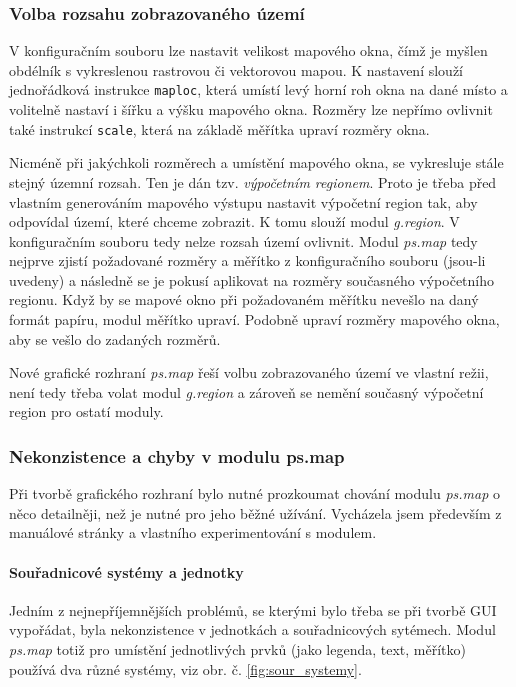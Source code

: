 \documentclass[a4paper,12pt,draft]{article}
\newcommand{\modul}[1]{\emph{#1}}
\newcommand{\instr}[1]{\lstinline[style=psmapInline]|#1|}
\begin{document}
\subsubsection{Volba rozsahu zobrazovaného území}
\label{sec:psmap:rozsah}
V konfiguračním souboru lze nastavit velikost mapového okna, čímž je myšlen obdélník s vykreslenou rastrovou či vektorovou mapou.  K nastavení slouží jednořádková instrukce \instr{maploc}, která umístí levý horní roh okna na dané místo a volitelně nastaví i šířku a výšku mapového okna. Rozměry lze nepřímo ovlivnit také instrukcí \instr{scale}, která na základě měřítka upraví rozměry okna. 

Nicméně při jakýchkoli rozměrech a umístění mapového okna, se vykresluje stále stejný územní rozsah. Ten je dán tzv. \emph{výpočetním regionem}. Proto je třeba před vlastním generováním mapového výstupu nastavit výpočetní region tak, aby odpovídal území, které chceme zobrazit. K tomu slouží modul \modul{g.region}. V konfiguračním souboru tedy nelze rozsah území ovlivnit.
Modul \modul{ps.map} tedy nejprve zjistí požadované rozměry a měřítko z konfiguračního souboru (jsou-li uvedeny) a následně se je pokusí aplikovat na rozměry současného výpočetního regionu. Když by se mapové okno při požadovaném měřítku nevešlo na daný formát papíru, modul měřítko upraví. Podobně upraví rozměry mapového okna, aby se vešlo do zadaných rozměrů.

Nové grafické rozhraní \modul{ps.map} řeší volbu zobrazovaného území ve vlastní režii, není tedy třeba volat modul \modul{g.region} a zároveň se nemění současný výpočetní region pro ostatí moduly. %

\subsubsection{Nekonzistence a chyby v modulu ps.map}
\label{sec:psmap:chyby}
Při tvorbě grafického rozhraní bylo nutné prozkoumat chování modulu \modul{ps.map} o něco detailněji, než je nutné pro jeho běžné užívání. Vycházela jsem především z manuálové stránky \cite{manual} a vlastního experimentování s modulem. 

\paragraph*{Souřadnicové systémy a jednotky}
\label{sec:psmap:sour_systemy}
Jedním z nejnepříjemnějších problémů, se kterými bylo třeba se při tvorbě GUI vypořádat, byla nekonzistence v jednotkách a souřadnicových sytémech. Modul \modul{ps.map} totiž pro umístění jednotlivých prvků (jako legenda, text, měřítko) používá dva různé systémy, viz obr. č. \ref{fig:sour_systemy}.
\end{document}
